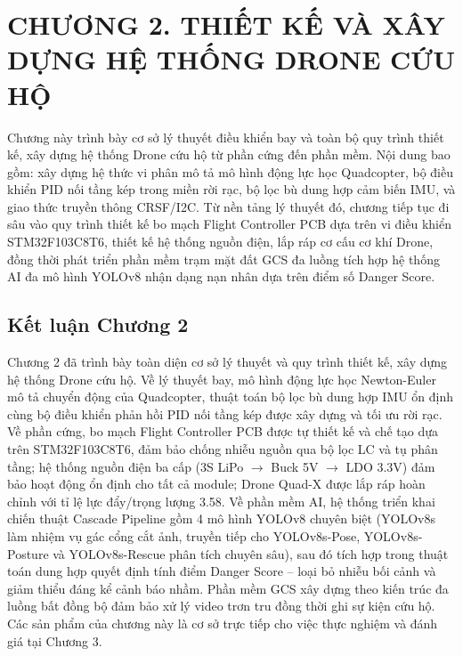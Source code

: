 \section*{CHƯƠNG 2. THIẾT KẾ VÀ XÂY DỰNG HỆ THỐNG DRONE CỨU HỘ}
\setcounter{section}{2}
\setcounter{subsection}{0}
\setcounter{figure}{0}
\setcounter{table}{0}

Chương này trình bày cơ sở lý thuyết điều khiển bay và toàn bộ quy trình thiết kế, xây dựng hệ thống Drone cứu hộ từ phần cứng đến phần mềm. Nội dung bao gồm: xây dựng hệ thức vi phân mô tả mô hình động lực học Quadcopter, bộ điều khiển PID nối tầng kép trong miền rời rạc, bộ lọc bù dung hợp cảm biến IMU, và giao thức truyền thông CRSF/I2C. Từ nền tảng lý thuyết đó, chương tiếp tục đi sâu vào quy trình thiết kế bo mạch Flight Controller PCB dựa trên vi điều khiển STM32F103C8T6, thiết kế hệ thống nguồn điện, lắp ráp cơ cấu cơ khí Drone, đồng thời phát triển phần mềm trạm mặt đất GCS đa luồng tích hợp hệ thống AI đa mô hình YOLOv8 nhận dạng nạn nhân dựa trên điểm số Danger Score.



\bigskip


\bigskip


\subsection*{Kết luận Chương 2}

Chương 2 đã trình bày toàn diện cơ sở lý thuyết và quy trình thiết kế, xây dựng hệ thống Drone cứu hộ. Về lý thuyết bay, mô hình động lực học Newton-Euler mô tả chuyển động của Quadcopter, thuật toán bộ lọc bù dung hợp IMU ổn định cùng bộ điều khiển phản hồi PID nối tầng kép được xây dựng và tối ưu rời rạc. Về phần cứng, bo mạch Flight Controller PCB được tự thiết kế và chế tạo dựa trên STM32F103C8T6, đảm bảo chống nhiễu nguồn qua bộ lọc LC và tụ phân tầng; hệ thống nguồn điện ba cấp (3S LiPo $\rightarrow$ Buck 5V $\rightarrow$ LDO 3.3V) đảm bảo hoạt động ổn định cho tất cả module; Drone Quad-X được lắp ráp hoàn chỉnh với tỉ lệ lực đẩy/trọng lượng 3.58. Về phần mềm AI, hệ thống triển khai chiến thuật Cascade Pipeline gồm 4 mô hình YOLOv8 chuyên biệt (YOLOv8s làm nhiệm vụ gác cổng cắt ảnh, truyền tiếp cho YOLOv8s-Pose, YOLOv8s-Posture và YOLOv8s-Rescue phân tích chuyên sâu), sau đó tích hợp trong thuật toán dung hợp quyết định tính điểm Danger Score -- loại bỏ nhiễu bối cảnh và giảm thiểu đáng kể cảnh báo nhầm. Phần mềm GCS xây dựng theo kiến trúc đa luồng bất đồng bộ đảm bảo xử lý video trơn tru đồng thời ghi sự kiện cứu hộ. Các sản phẩm của chương này là cơ sở trực tiếp cho việc thực nghiệm và đánh giá tại Chương 3.
